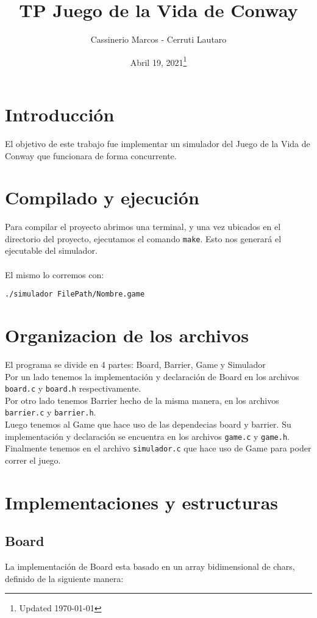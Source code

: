 \documentclass[]{article}
\begin{document}
	
\title{TP Juego de la Vida de Conway}
\author{Cassinerio Marcos - Cerruti Lautaro}
\date{Abril 19, 2021\footnote{Updated \today}}
\maketitle
\newpage

\section{Introducción}
El objetivo de este trabajo fue implementar un simulador del Juego de la Vida
de Conway que funcionara de forma concurrente.

\section{Compilado y ejecución}
Para compilar el proyecto abrimos una terminal, y una vez ubicados en el directorio del proyecto, ejecutamos el comando \verb|make|. Esto nos generará el ejecutable del simulador.\\\\
El mismo lo corremos con: 

\verb|./simulador FilePath/Nombre.game|

\section{Organizacion de los archivos}
El programa se divide en 4 partes: Board, Barrier, Game y Simulador\\
Por un lado tenemos la implementación y declaración de Board en los archivos \verb|board.c| y \verb|board.h| respectivamente.\\
Por otro lado tenemos Barrier hecho de la misma manera, en los archivos \verb|barrier.c| y \verb|barrier.h|.\\
Luego tenemos al Game que hace uso de las dependecias board y barrier. Su implementación y declaración se encuentra en los archivos \verb|game.c| y \verb|game.h|.\\
Finalmente tenemos en el archivo \verb|simulador.c| que hace uso de Game para poder correr el juego.
\newpage
\section{Implementaciones y estructuras}
\subsection{Board}
La implementación de Board esta basado en un array bidimensional de chars, definido de la siguiente manera:
\end{document}
